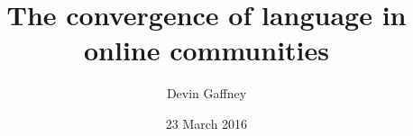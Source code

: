 \documentclass[letterpaper,12pt]{article}
\title{The convergence of language in online communities}
\date{23 March 2016}
\author{Devin Gaffney}
\begin{document}
\maketitle

\onehalfspacing
\smallskip
\end{document}
